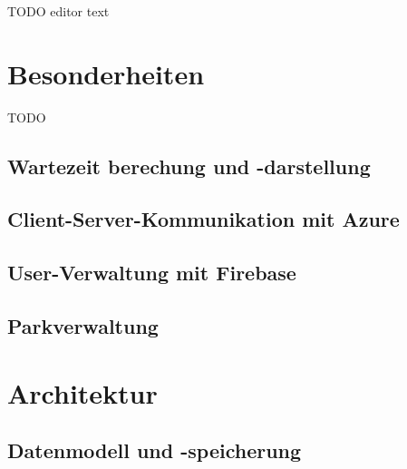 TODO editor text

















\section{Besonderheiten}
\label{sec:implementierung:besonderheiten}

TODO

\subsection{Wartezeit berechung und -darstellung}
\label{sec:implementierung:besonderheiten:wartezeit}

\subsection{Client-Server-Kommunikation mit Azure}
\label{sec:implementierung:besonderheiten:azure}


\subsection{User-Verwaltung mit Firebase}
\label{sec:implementierung:besonderheiten:firebase}


\subsection{Parkverwaltung}
\label{sec:implementierung:besonderheiten:parkverwaltung}



\section{Architektur}
\label{sec:implementierung:architektur}

\subsection{Datenmodell und -speicherung}
\label{sec:implementierung:architektur:datenmodell}

